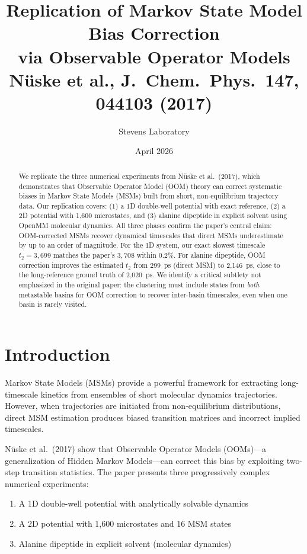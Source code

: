 \documentclass[11pt,a4paper]{article}
\title{\textbf{Replication of Markov State Model Bias Correction\\via Observable Operator Models}\\[12pt]
\large N\"uske et al., J.\ Chem.\ Phys.\ 147, 044103 (2017)}
\author{Stevens Laboratory}
\date{April 2026}
\begin{document}
\maketitle

\begin{abstract}
We replicate the three numerical experiments from N\"uske et al.\ (2017), which demonstrates that Observable Operator Model (OOM) theory can correct systematic biases in Markov State Models (MSMs) built from short, non-equilibrium trajectory data. Our replication covers: (1) a 1D double-well potential with exact reference, (2) a 2D potential with 1,600 microstates, and (3) alanine dipeptide in explicit solvent using OpenMM molecular dynamics. All three phases confirm the paper's central claim: OOM-corrected MSMs recover dynamical timescales that direct MSMs underestimate by up to an order of magnitude. For the 1D system, our exact slowest timescale $t_2 = 3{,}699$ matches the paper's $3{,}708$ within 0.2\%. For alanine dipeptide, OOM correction improves the estimated $t_2$ from 299~ps (direct MSM) to 2{,}146~ps, close to the long-reference ground truth of 2{,}020~ps. We identify a critical subtlety not emphasized in the original paper: the clustering must include states from \textit{both} metastable basins for OOM correction to recover inter-basin timescales, even when one basin is rarely visited.
\end{abstract}

\tableofcontents
\newpage

\section{Introduction}

Markov State Models (MSMs) provide a powerful framework for extracting long-timescale kinetics from ensembles of short molecular dynamics trajectories. However, when trajectories are initiated from non-equilibrium distributions, direct MSM estimation produces biased transition matrices and incorrect implied timescales.

N\"uske et al.\ (2017) show that Observable Operator Models (OOMs)---a generalization of Hidden Markov Models---can correct this bias by exploiting two-step transition statistics. The paper presents three progressively complex numerical experiments:
\begin{enumerate}[nosep]
    \item A 1D double-well potential with analytically solvable dynamics
    \item A 2D potential with 1,600 microstates and 16 MSM states
    \item Alanine dipeptide in explicit solvent (molecular dynamics)
\end{enumerate}
\end{document}
